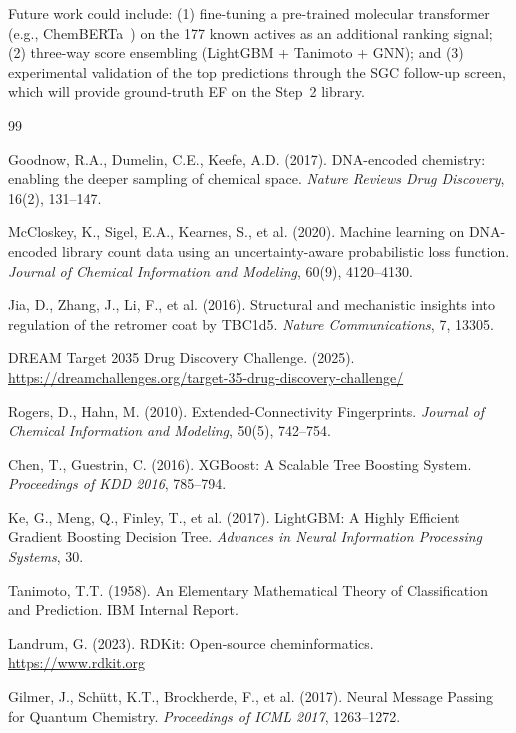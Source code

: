 \documentclass[10pt, letterpaper]{article}
\begin{document}
Future work could include: (1) fine-tuning a pre-trained molecular transformer (e.g., ChemBERTa~\cite{Chithrananda2020}) on the 177 known actives as an additional ranking signal; (2) three-way score ensembling (LightGBM + Tanimoto + GNN); and (3) experimental validation of the top predictions through the SGC follow-up screen, which will provide ground-truth EF on the Step~2 library.


\begin{thebibliography}{99}

Goodnow, R.A., Dumelin, C.E., Keefe, A.D. (2017).
DNA-encoded chemistry: enabling the deeper sampling of chemical space.
\textit{Nature Reviews Drug Discovery}, 16(2), 131--147.

McCloskey, K., Sigel, E.A., Kearnes, S., et al. (2020).
Machine learning on DNA-encoded library count data using an uncertainty-aware probabilistic loss function.
\textit{Journal of Chemical Information and Modeling}, 60(9), 4120--4130.

Jia, D., Zhang, J., Li, F., et al. (2016).
Structural and mechanistic insights into regulation of the retromer coat by TBC1d5.
\textit{Nature Communications}, 7, 13305.

DREAM Target 2035 Drug Discovery Challenge. (2025).
\url{https://dreamchallenges.org/target-35-drug-discovery-challenge/}

Rogers, D., Hahn, M. (2010).
Extended-Connectivity Fingerprints.
\textit{Journal of Chemical Information and Modeling}, 50(5), 742--754.

Chen, T., Guestrin, C. (2016).
XGBoost: A Scalable Tree Boosting System.
\textit{Proceedings of KDD 2016}, 785--794.

Ke, G., Meng, Q., Finley, T., et al. (2017).
LightGBM: A Highly Efficient Gradient Boosting Decision Tree.
\textit{Advances in Neural Information Processing Systems}, 30.

Tanimoto, T.T. (1958).
An Elementary Mathematical Theory of Classification and Prediction.
IBM Internal Report.

Landrum, G. (2023).
RDKit: Open-source cheminformatics. \url{https://www.rdkit.org}

Gilmer, J., Schütt, K.T., Brockherde, F., et al. (2017).
Neural Message Passing for Quantum Chemistry.
\textit{Proceedings of ICML 2017}, 1263--1272.


\end{thebibliography}
\end{document}
